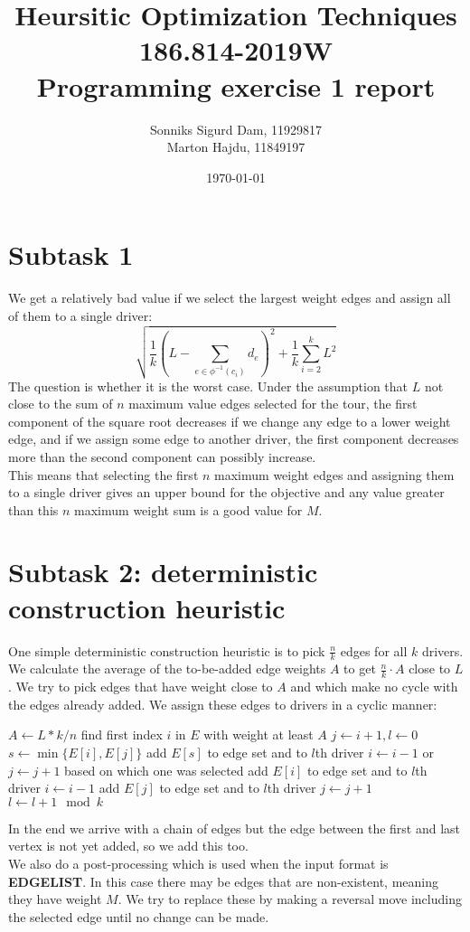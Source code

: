 \documentclass{article}
\title{Heursitic Optimization Techniques\\186.814-2019W\\Programming exercise 1 report}
\date{\today}
\author{Sonniks Sigurd Dam, 11929817\\Marton Hajdu, 11849197}
\begin{document}
\maketitle
\section*{Subtask 1}
We get a relatively bad value if we select the largest weight edges and assign all of them to a single driver:
$$\sqrt{\frac{1}{k}(L-\sum_{e\in\phi^{-1}(c_i)}{d_e})^2+\frac{1}{k}\sum_{i=2}^{k}{L^2}}$$
The question is whether it is the worst case. Under the assumption that $L$ not close to the sum of $n$ maximum value edges selected for the tour, the first component of the square root decreases if we change any edge to a lower weight edge, and if we assign some edge to another driver, the first component decreases more than the second component can possibly increase.\medskip\\
This means that selecting the first $n$ maximum weight edges and assigning them to a single driver gives an upper bound for the objective and any value greater than this $n$ maximum weight sum is a good value for $M$.
\section*{Subtask 2: deterministic construction heuristic}
One simple deterministic construction heuristic is to pick $\frac{n}{k}$ edges for all $k$ drivers. We calculate the average of the to-be-added edge weights $A$ to get $\frac{n}{k}\cdot A$ close to $L$. We try to pick edges that have weight close to $A$ and which make no cycle with the edges already added. We assign these edges to drivers in a cyclic manner:
\begin{algorithmic}[1]
\State $A \gets L*k/n$
\State find first index $i$ in $E$ with weight at least $A$
\State $j \gets i+1, l \gets 0$
\State $s \gets \min\{E[i],E[j]\}$
\State add $E[s]$ to edge set and to $l$th driver
\State $i \gets i - 1$ or $j \gets j + 1$ based on which one was selected
\EndIf
{}
\State add $E[i]$ to edge set and to $l$th driver
\State $i \gets i - 1$
\Else
\State add $E[j]$ to edge set and to $l$th driver
\State $j \gets j + 1$
\EndIf
\State $l \gets l + 1 \mod k$
\EndWhile
\EndFunction
\end{algorithmic}
In the end we arrive with a chain of edges but the edge between the first and last vertex is not yet added, so we add this too.\medskip\\
We also do a post-processing which is used when the input format is \textbf{EDGELIST}. In this case there may be edges that are non-existent, meaning they have weight $M$. We try to replace these by making a reversal move including the selected edge until no change can be made.
\end{document}
